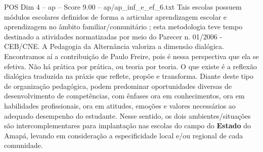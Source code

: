 \begin{textsample}{POS Dim 4 – ap – Score 9.00 – ap/ap\_inf\_e\_ef\_6.txt}
Tais escolas possuem módulos escolares definidos de forma a articular aprendizagem escolar e aprendizagem no âmbito familiar/comunitário ; esta metodologia teve tempo destinado a atividades normatizadas por meio do Parecer n. 01/2006 - CEB/CNE.
A Pedagogia da Alternância valoriza a dimensão dialógica.
Encontramos aí a contribuição de Paulo Freire, pois é nessa perspectiva que ela se efetiva.
Não há prática por prática, ou teoria por teoria.
O que existe é a reflexão dialógica traduzida na práxis que reflete, propõe e transforma.
Diante deste tipo de organização pedagógica, podem predominar oportunidades diversas de desenvolvimento de competências, com ênfases ora em conhecimentos, ora em habilidades profissionais, ora em atitudes, emoções e valores necessários ao adequado desempenho do estudante.
Nesse sentido, os dois ambientes/situações são intercomplementares para implantação nas escolas do campo do \textbf{Estado} do Amapá, levando em consideração a especificidade local e/ou regional de cada comunidade.

\end{textsample}
